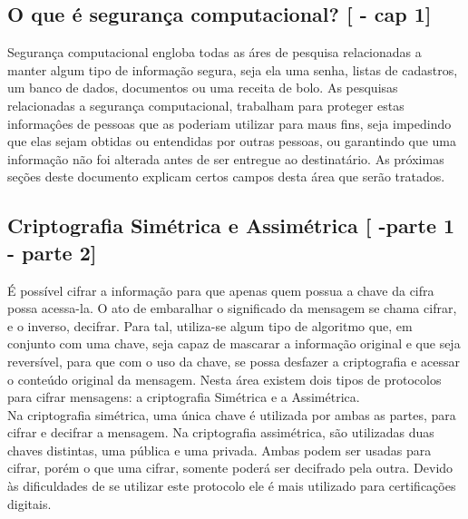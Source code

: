 \documentclass{article}
\begin{document}
		\subsection{O que é segurança computacional? [\cite{STALLINS} - cap 1]}
			\begin{justify}
			
				\hspace{2cm} Segurança computacional engloba todas as áres de pesquisa relacionadas a manter algum tipo de informação segura, seja ela uma senha, listas de cadastros, um banco de dados, documentos ou uma receita de bolo. As pesquisas relacionadas a segurança computacional, trabalham para proteger estas informaçôes de pessoas que as poderiam utilizar para maus fins, seja impedindo que elas sejam obtidas ou entendidas por outras pessoas, ou garantindo que uma informação não foi alterada antes de ser entregue ao destinatário. As próximas seções deste documento explicam certos campos desta área que serão tratados.
			
			\end{justify}

		\subsection{Criptografia Simétrica e Assimétrica [\cite{STALLINS} -parte 1 - parte 2]}
			\begin{justify}
			

	 			\hspace{2cm} É possível cifrar a informação para que apenas quem possua a chave da cifra possa acessa-la. O ato de embaralhar o significado da mensagem se chama cifrar, e o inverso, decifrar. Para tal, utiliza-se algum tipo de algoritmo que, em conjunto com uma chave, seja capaz de mascarar a informação original e que seja reversível, para que com o uso da chave, se possa desfazer a criptografia e acessar o conteúdo original da mensagem. Nesta área existem dois tipos de protocolos para cifrar mensagens: a criptografia Simétrica e a Assimétrica. \\
				\hspace*{2cm}Na criptografia simétrica, uma única chave é utilizada por ambas as partes, para cifrar e decifrar a mensagem. Na criptografia assimétrica, são utilizadas duas chaves distintas, uma pública e uma privada. Ambas podem ser usadas para cifrar, porém o que uma cifrar, somente poderá ser decifrado pela outra. Devido às dificuldades de se utilizar este protocolo ele é mais utilizado para certificações digitais.
					
			\end{justify}
\end{document}
